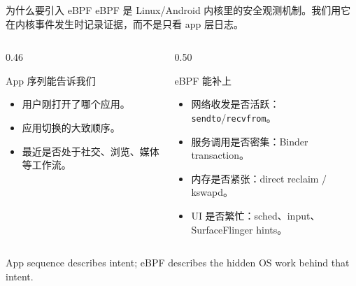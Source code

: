 \documentclass[UTF8,aspectratio=169,10pt]{ctexbeamer}
\newcommand{\code}[1]{\texttt{\small #1}}
\begin{document}
\begin{frame}{为什么要引入 eBPF}
  {\scriptsize eBPF 是 Linux/Android 内核里的安全观测机制。我们用它在内核事件发生时记录证据，而不是只看 app 层日志。}
  \vspace{0.35em}
  \begin{columns}[T,totalwidth=\textwidth]
    \begin{column}{0.46\textwidth}
      \begin{block}{App 序列能告诉我们}
        \begin{itemize}
          \item 用户刚打开了哪个应用。
          \item 应用切换的大致顺序。
          \item 最近是否处于社交、浏览、媒体等工作流。
        \end{itemize}
      \end{block}
    \end{column}
    \begin{column}{0.50\textwidth}
      \begin{block}{eBPF 能补上}
        \begin{itemize}
          \item 网络收发是否活跃：\code{sendto}/\code{recvfrom}。
          \item 服务调用是否密集：Binder transaction。
          \item 内存是否紧张：direct reclaim / kswapd。
          \item UI 是否繁忙：sched、input、SurfaceFlinger hints。
        \end{itemize}
      \end{block}
    \end{column}
  \end{columns}
  \vspace{0.6em}
  \centering
  \large App sequence describes intent; eBPF describes the hidden OS work behind that intent.
\end{frame}
\end{document}
